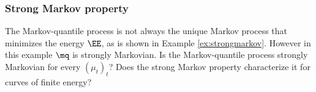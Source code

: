 \subsubsection{Strong Markov property}\label{ss:strong}
The Markov-quantile process is not always the unique Markov process that minimizes the energy $\EE$, as is shown in Example \ref{ex:strongmarkov}. However in this example $\mq$ is strongly Markovian. Is the Markov-quantile process strongly Markovian for every $(\mu_t)_t$? Does the strong Markov property characterize it for curves of finite energy?


